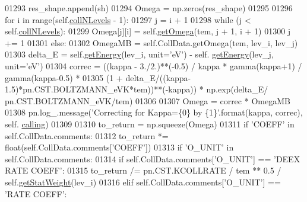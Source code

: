 \begin{DoxyCode}
01293                     res\_shape.append(sh)
01294                 Omega = np.zeros(res\_shape)
01295         
01296                 \textcolor{keywordflow}{for} i \textcolor{keywordflow}{in} range(self.\hyperlink{classpyneb_1_1core_1_1pynebcore_1_1_atom_a8beaa0244d575054b3e2748a5e00d8db}{collNLevels} - 1):
01297                     j = i + 1
01298                     \textcolor{keywordflow}{while} (j < self.\hyperlink{classpyneb_1_1core_1_1pynebcore_1_1_atom_a8beaa0244d575054b3e2748a5e00d8db}{collNLevels}):
01299                         Omega[j][i] = self.\hyperlink{classpyneb_1_1core_1_1pynebcore_1_1_atom_ae133eed382e284df01f2183da341534b}{getOmega}(tem, j + 1, i + 1)
01300                         j += 1
01301             \textcolor{keywordflow}{else}:
01302                 OmegaMB = self.CollData.getOmega(tem, lev\_i, lev\_j)
01303                 delta\_E = self.\hyperlink{classpyneb_1_1core_1_1pynebcore_1_1_atom_a9940acb2999e864edf9761d822e65d7f}{getEnergy}(lev\_i, unit=\textcolor{stringliteral}{'eV'}) - self.
      \hyperlink{classpyneb_1_1core_1_1pynebcore_1_1_atom_a9940acb2999e864edf9761d822e65d7f}{getEnergy}(lev\_j, unit=\textcolor{stringliteral}{'eV'})
01304                 correc = ((kappa - 3./2.)**(-0.5) / kappa * gamma(kappa+1) / gamma(kappa-0.5) * 
01305                           (1 + delta\_E/((kappa-1.5)*pn.CST.BOLTZMANN\_eVK*tem))**(-kappa)) * np.exp(delta\_E/
      pn.CST.BOLTZMANN\_eVK/tem)
01306     
01307                 Omega = correc * OmegaMB
01308                 pn.log\_.message(\textcolor{stringliteral}{'Correcting for Kappa=\{0\} by \{1\}'}.format(kappa, correc), self.
      \hyperlink{classpyneb_1_1core_1_1pynebcore_1_1_atom_a373b7735acf4f528b54bddf373ad67a1}{calling})
01309 
01310             to\_return = np.squeeze(Omega)
01311         \textcolor{keywordflow}{if} \textcolor{stringliteral}{'COEFF'} \textcolor{keywordflow}{in} self.CollData.comments:
01312             to\_return *= float(self.CollData.comments[\textcolor{stringliteral}{'COEFF'}])
01313         \textcolor{keywordflow}{if} \textcolor{stringliteral}{'O\_UNIT'} \textcolor{keywordflow}{in} self.CollData.comments:
01314             \textcolor{keywordflow}{if} self.CollData.comments[\textcolor{stringliteral}{'O\_UNIT'}] == \textcolor{stringliteral}{'DEEX RATE COEFF'}:
01315                 to\_return /= pn.CST.KCOLLRATE / tem ** 0.5 / self.\hyperlink{classpyneb_1_1core_1_1pynebcore_1_1_atom_a0f2483487115f19556586b9e422bd5fb}{getStatWeight}(lev\_i)
01316             \textcolor{keywordflow}{elif} self.CollData.comments[\textcolor{stringliteral}{'O\_UNIT'}] == \textcolor{stringliteral}{'RATE COEFF'}:

\end{DoxyCode}
